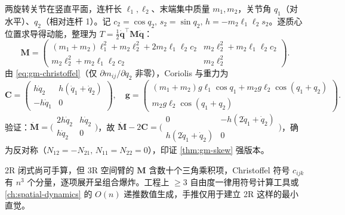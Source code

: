 \begin{example}\label{ex:gm-2r}
两旋转关节在竖直平面，连杆长 $\ell_1,\ell_2$、末端集中质量 $m_1,m_2$，关节角 $q_1$（对水平）、$q_2$（相对连杆 1）。记 $c_2=\cos q_2,\,s_2=\sin q_2,\,h=-m_2\ell_1\ell_2 s_2$。逐质心位置求导得动能，整理为 $T=\tfrac12\dot{\mathbf q}^\top\mathbf M\dot{\mathbf q}$：
\begin{equation}
  \mathbf M=\begin{pmatrix}(m_1+m_2)\ell_1^2+m_2\ell_2^2+2m_2\ell_1\ell_2 c_2 & m_2\ell_2^2+m_2\ell_1\ell_2 c_2\\[2pt] m_2\ell_2^2+m_2\ell_1\ell_2 c_2 & m_2\ell_2^2\end{pmatrix}.
  \label{eq:gm-2r-M}
\end{equation}
由 \cref{eq:gm-christoffel}（仅 $\partial m_{ij}/\partial q_2$ 非零），Coriolis 与重力为
\begin{equation}
  \mathbf C=\begin{pmatrix}h\dot q_2 & h(\dot q_1+\dot q_2)\\ -h\dot q_1 & 0\end{pmatrix},\quad
  \mathbf g=\begin{pmatrix}(m_1+m_2)g\ell_1\cos q_1+m_2 g\ell_2\cos(q_1+q_2)\\ m_2 g\ell_2\cos(q_1+q_2)\end{pmatrix}.
  \label{eq:gm-2r-Cg}
\end{equation}
验证：$\dot{\mathbf M}=\bigl(\begin{smallmatrix}2h\dot q_2 & h\dot q_2\\ h\dot q_2 & 0\end{smallmatrix}\bigr)$，故
$\dot{\mathbf M}-2\mathbf C=\bigl(\begin{smallmatrix}0 & -h(2\dot q_1+\dot q_2)\\ h(2\dot q_1+\dot q_2) & 0\end{smallmatrix}\bigr)$，确为反对称（$N_{12}=-N_{21},\,N_{11}=N_{22}=0$），印证 \cref{thm:gm-skew} 强版本。
\end{example}

\begin{remark}[为何 $\ge3$ 自由度不手推]
2R 闭式尚可手算，但 3R 空间臂的 $\mathbf M$ 含数十个三角乘积项，Christoffel 符号 $c_{ijk}$ 有 $n^3$ 个分量，逐项展开呈组合爆炸。工程上 $\ge3$ 自由度一律用符号计算工具或 \cref{ch:spatial-dynamics} 的 $O(n)$ 递推数值生成，手推仅用于建立 2R 这样的最小直觉。
\end{remark}


